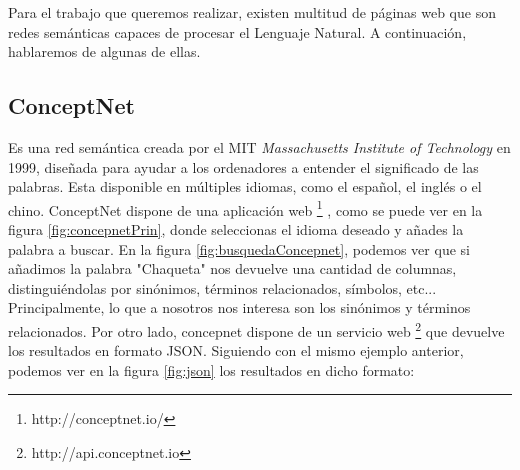 Para el trabajo que queremos realizar, existen multitud de páginas web que son redes semánticas capaces de procesar el Lenguaje Natural.  A continuación, hablaremos de algunas de ellas.

\subsection{ConceptNet} 
\label{cap:subsec:concepnet}

Es una red semántica creada por el MIT \textit{Massachusetts Institute of Technology} en 1999, diseñada para ayudar a los ordenadores a entender el significado de las palabras. Esta disponible en múltiples idiomas, como el español, el inglés o el chino. ConceptNet dispone de una aplicación web \footnote{http://conceptnet.io/} , como se puede ver en la figura \ref{fig:concepnetPrin}, donde seleccionas el idioma deseado y añades la palabra a buscar.  En la figura  \ref{fig:busquedaConcepnet}, podemos ver que si añadimos la palabra "Chaqueta" nos devuelve una cantidad de columnas, distinguiéndolas por sinónimos, términos relacionados, símbolos, etc... Principalmente, lo que a nosotros nos interesa son los sinónimos y términos relacionados.   
Por otro lado, concepnet dispone de un servicio web \footnote{http://api.conceptnet.io} que devuelve los resultados en formato JSON. Siguiendo con el mismo ejemplo anterior, podemos ver en la figura  \ref{fig:json} los resultados en dicho formato:
	

